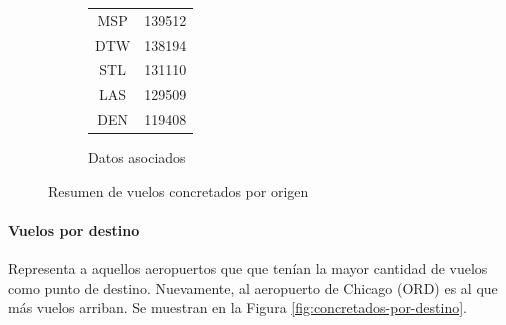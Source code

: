 \documentclass[12pt]{article}
\numberwithin{equation}{section}
\numberwithin{table}{section}
\numberwithin{figure}{section}
\begin{document}
\begin{figure}
\begin{subfigure}[b]{0.3\textwidth}
\begin{tabular}{@{}cc@{}}
MSP                 & 139512            \\
DTW                 & 138194            \\
STL                 & 131110            \\
LAS                 & 129509            \\
DEN                 & 119408            \\ \bottomrule
\end{tabular}
                \caption{Datos asociados}
        \end{subfigure}
        \caption{Resumen de vuelos concretados por origen}
        \label{fig:concretados-por-origen}
\end{figure}


\paragraph{Vuelos por destino}
Representa a aquellos aeropuertos que que tenían la mayor cantidad de vuelos como punto de destino. 
Nuevamente, al aeropuerto de Chicago (ORD) es al que más vuelos arriban.
Se muestran en la Figura \ref{fig:concretados-por-destino}.
\end{document}
